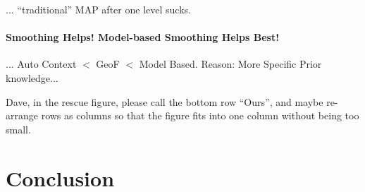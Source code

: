 \documentclass[10pt,twocolumn,letterpaper]{article}
\begin{document}
... "`traditional"' MAP after one level sucks. 

\paragraph{Smoothing Helps! Model-based Smoothing Helps Best!}
... Auto Context $<$ GeoF $<$ Model Based. Reason: More Specific Prior knowledge...

Dave, in the rescue figure, please call the bottom row "`Ours"', and maybe re-arrange rows as columns so that the figure fits into one column without being too small. 

\section{Conclusion}

{\small


}
\end{document}
